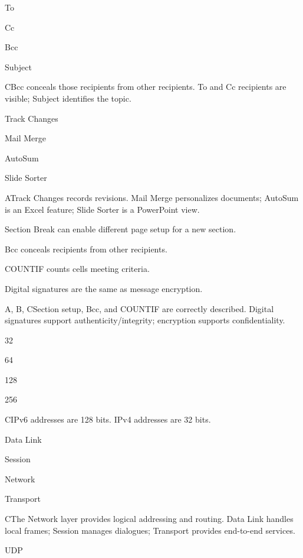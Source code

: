 \begin{enumerate}[label=\textbf{Q\arabic*.}, leftmargin=*]
  {\item To
   \item Cc
   \item Bcc
   \item Subject}
  {C}{Bcc conceals those recipients from other recipients. To and Cc recipients are visible; Subject identifies the topic.}
  {\item Track Changes
   \item Mail Merge
   \item AutoSum
   \item Slide Sorter}
  {A}{Track Changes records revisions. Mail Merge personalizes documents; AutoSum is an Excel feature; Slide Sorter is a PowerPoint view.}
  {\item Section Break can enable different page setup for a new section.
   \item Bcc conceals recipients from other recipients.
   \item COUNTIF counts cells meeting criteria.
   \item Digital signatures are the same as message encryption.}
  {A, B, C}{Section setup, Bcc, and COUNTIF are correctly described. Digital signatures support authenticity/integrity; encryption supports confidentiality.}
\fi
\ifnum{}
  {\item 32
   \item 64
   \item 128
   \item 256}
  {C}{IPv6 addresses are 128 bits. IPv4 addresses are 32 bits.}
  {\item Data Link
   \item Session
   \item Network
   \item Transport}
  {C}{The Network layer provides logical addressing and routing. Data Link handles local frames; Session manages dialogues; Transport provides end-to-end services.}
  {\item UDP
}
\end{enumerate}
